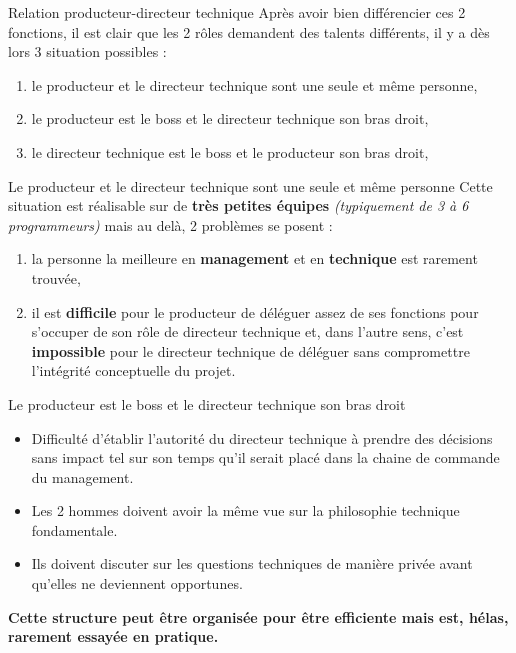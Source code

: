 \documentclass{beamer}
\begin{document}
\begin{frame}{Relation producteur-directeur technique}
Après avoir bien différencier ces 2 fonctions, il est clair que les 2 rôles demandent des talents différents, il y a dès lors 3
situation possibles :
\pause \begin{enumerate}
\item le producteur et le directeur technique sont une seule et même personne,
\item le producteur est le boss et le directeur technique son bras droit,
\item le directeur technique est le boss et le producteur son bras droit,
\end{enumerate}
\end{frame}

\begin{frame}{Le producteur et le directeur technique sont une seule et même personne}
Cette situation est réalisable sur de \textbf{très petites équipes} \textit{(typiquement de 3 à 6 programmeurs)} mais au delà, 2 
problèmes se posent :
\begin{enumerate}
\pause \item la personne la meilleure en \textbf{management} et en \textbf{technique} est rarement trouvée,
\pause \item il est \textbf{difficile} pour le producteur de déléguer assez de ses fonctions pour s'occuper de son rôle de 
directeur technique et, dans l'autre sens, c'est \textbf{impossible} pour le directeur technique de déléguer sans compromettre 
l'intégrité conceptuelle du projet.
\end{enumerate}
\end{frame}

\begin{frame}{Le producteur est le boss et le directeur technique son bras droit}
\begin{itemize}
\item Difficulté d'établir l'autorité du directeur technique à prendre des décisions sans impact tel sur son temps qu'il serait 
placé dans la chaine de commande du management.
\item Les 2 hommes doivent avoir la même vue sur la philosophie technique fondamentale.
\item Ils doivent discuter sur les questions techniques de manière privée avant qu'elles ne deviennent opportunes.
\end{itemize}
\textbf{Cette structure peut être organisée pour être efficiente mais est, hélas, rarement essayée en pratique.}
\end{frame}
\end{document}
